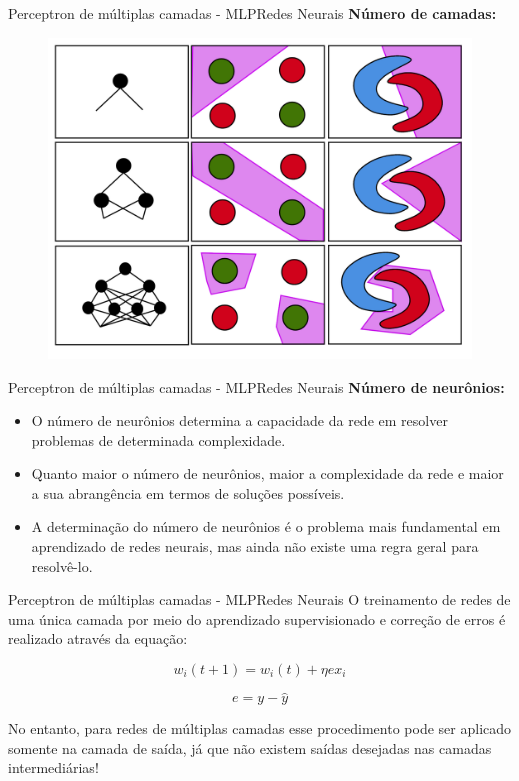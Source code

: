 \documentclass[t]{beamer}
\begin{document}
\begin{ftst}{Perceptron de múltiplas camadas - MLP}{Redes Neurais}
\textbf{Número de camadas:}
\vone

\begin{figure}
    \centering
    \includegraphics[scale=0.15]{Figuras/regioes.png}
\end{figure}

\end{ftst}


\begin{ftst}{Perceptron de múltiplas camadas - MLP}{Redes Neurais}
\textbf{Número de neurônios:}
\vone
\begin{itemize}
    \item O número de neurônios determina a capacidade da rede em resolver problemas de determinada complexidade. 
    \item Quanto maior o número de neurônios, maior a complexidade da rede e maior a sua abrangência em termos de soluções possíveis.
    \item A determinação do número de neurônios é o problema mais fundamental em aprendizado de redes neurais, mas ainda não existe uma regra geral para resolvê-lo.
\end{itemize}

\end{ftst}


\begin{ftst}{Perceptron de múltiplas camadas - MLP}{Redes Neurais}
O treinamento de redes de uma única camada por meio do aprendizado supervisionado e correção de erros é realizado através da equação:

\begin{equation}
    w_i(t+1) = w_i(t) + \eta e x_i
\end{equation}

\begin{equation}
    e = y - \hat{y}
\end{equation}

No entanto, para redes de múltiplas camadas esse procedimento pode ser aplicado somente na camada de saída, já que não existem saídas desejadas nas camadas intermediárias!


\end{ftst}
\end{document}
